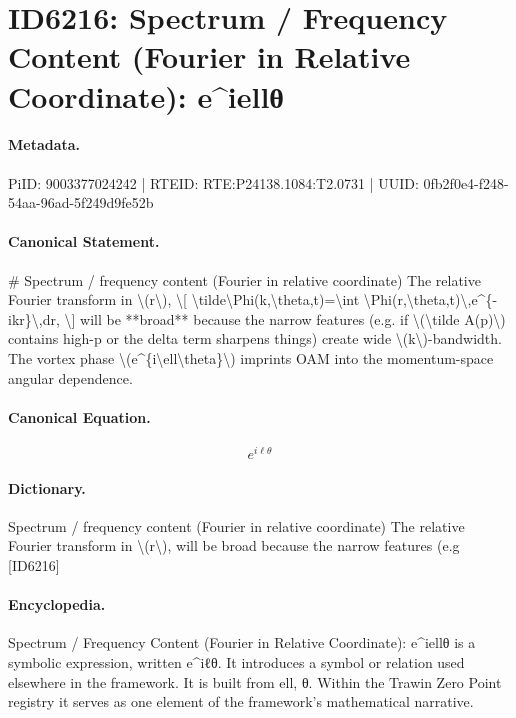 \section*{ID6216: Spectrum / Frequency Content (Fourier in Relative Coordinate): e\textasciicircum{}iellθ}
\paragraph{Metadata.}
PiID: 9003377024242 | RTEID: RTE:P24138.1084:T2.0731 | UUID: 0fb2f0e4-f248-54aa-96ad-5f249d9fe52b

\paragraph{Canonical Statement.}
\# Spectrum / frequency content (Fourier in relative coordinate) The relative Fourier transform in \textbackslash{}(r\textbackslash{}), \textbackslash{}[ \textbackslash{}tilde\textbackslash{}Phi(k,\textbackslash{}theta,t)=\textbackslash{}int \textbackslash{}Phi(r,\textbackslash{}theta,t)\textbackslash{},e\textasciicircum{}\{-ikr\}\textbackslash{},dr, \textbackslash{}] will be **broad** because the narrow features (e.g. if \textbackslash{}(\textbackslash{}tilde A(p)\textbackslash{}) contains high-p or the delta term sharpens things) create wide \textbackslash{}(k\textbackslash{})-bandwidth. The vortex phase \textbackslash{}(e\textasciicircum{}\{i\textbackslash{}ell\textbackslash{}theta\}\textbackslash{}) imprints OAM into the momentum-space angular dependence.

\paragraph{Canonical Equation.}
\[
e^{i\ell\theta}
\]

\paragraph{Dictionary.}
Spectrum / frequency content (Fourier in relative coordinate) The relative Fourier transform in \textbackslash{}(r\textbackslash{}), will be broad because the narrow features (e.g [ID6216]

\paragraph{Encyclopedia.}
Spectrum / Frequency Content (Fourier in Relative Coordinate): e\textasciicircum{}iellθ is a symbolic expression, written e\textasciicircum{}iℓθ. It introduces a symbol or relation used elsewhere in the framework. It is built from ell, θ. Within the Trawin Zero Point registry it serves as one element of the framework's mathematical narrative.
